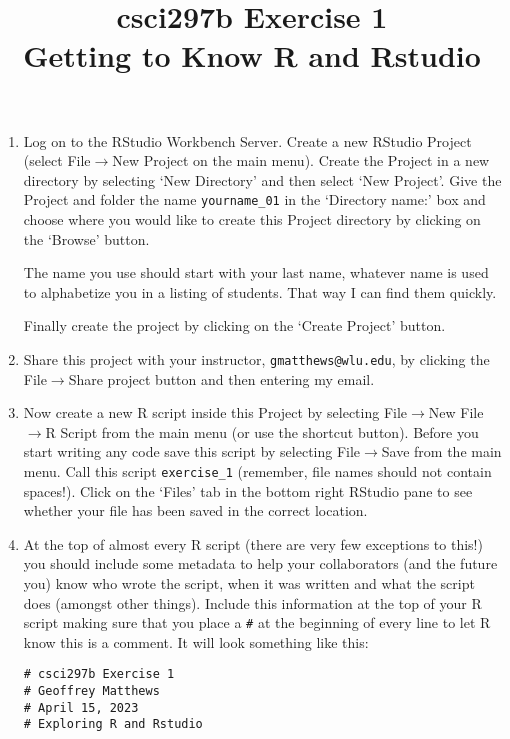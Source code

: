 \documentclass[12pt]{article}
\title{csci297b Exercise 1\\ Getting to Know R and Rstudio}
\date{}
\newcommand{\arrow}{\ensuremath{\rightarrow}}
\begin{document}
\maketitle

\begin{enumerate}

\item Log on to the RStudio Workbench Server. 
Create a new RStudio Project (select File\arrow New Project on the main menu). Create the Project in a new directory by selecting ‘New Directory’ and then select ‘New Project’. Give the Project and folder the name \verb|yourname_01| in the ‘Directory name:’ box and choose where you would like to create this Project directory by clicking on the ‘Browse’ button.

The name you use should start with your last name, whatever name is used to alphabetize
you in a listing of students.  That way I can find them quickly.

 Finally create the project by clicking on the ‘Create Project’ button. 

\item Share this project with your instructor, \verb|gmatthews@wlu.edu|, by
clicking the File\arrow Share project button and then entering my email.
 

\item Now create a new R script inside this Project by selecting File\arrow New File\arrow R Script from the main menu (or use the shortcut button). Before you start writing any code save this script by selecting File\arrow Save from the main menu. Call this script \verb|exercise_1|  (remember, file names should not contain spaces!). Click on the ‘Files’ tab in the bottom right RStudio pane to see whether your file has been saved in the correct location.

\item At the top of almost every R script (there are very few exceptions to this!) you should include some metadata to help your collaborators (and the future you) know who wrote the script, when it was written and what the script does (amongst other things). Include this information at the top of your R script making sure that you place a \lstinline{#} at the beginning of every line to let R know this is a comment. 
It will look something like this:
\begin{lstlisting}
# csci297b Exercise 1
# Geoffrey Matthews
# April 15, 2023
# Exploring R and Rstudio
\end{lstlisting}


\end{enumerate}
\end{document}
